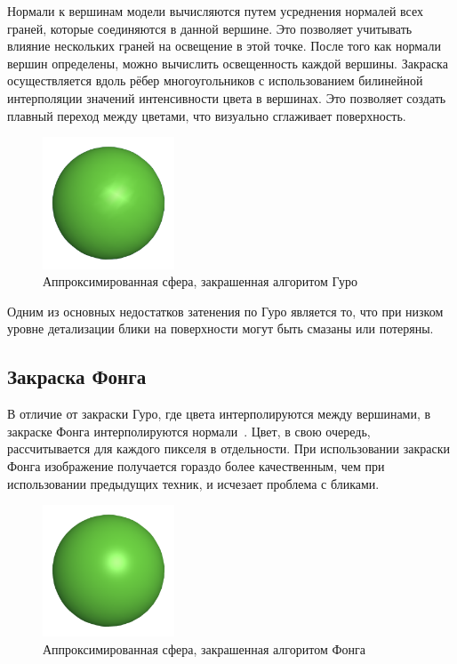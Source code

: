 Нормали к вершинам модели вычисляются путем усреднения нормалей всех граней, которые соединяются в данной вершине. Это позволяет учитывать влияние нескольких граней на освещение в этой точке. После того как нормали вершин определены, можно вычислить освещенность каждой вершины. Закраска осуществляется вдоль рёбер многоугольников с использованием билинейной интерполяции значений интенсивности цвета в вершинах. Это позволяет создать плавный переход между цветами, что визуально сглаживает поверхность.

\begin{figure}[h] 
	\centering
	\includegraphics[width=0.35\textwidth]{images/gurou-shading.png}
	\caption{Аппроксимированная сфера, закрашенная алгоритом Гуро} 
	\label{fig:gurou-shading} 
\end{figure}

Одним из основных недостатков затенения по Гуро является то, что при низком уровне детализации блики на поверхности могут быть смазаны или потеряны.

\subsection{Закраска Фонга}

В отличие от закраски Гуро, где цвета интерполируются между вершинами, в закраске Фонга интерполируются нормали~\cite{lit3}. Цвет, в свою очередь, рассчитывается для каждого пикселя в отдельности. При использовании закраски Фонга изображение получается гораздо более качественным, чем при использовании предыдущих техник, и исчезает проблема с бликами.

\begin{figure}[h] 
	\centering
	\includegraphics[width=0.35\textwidth]{images/phong-shading.png}
	\caption{Аппроксимированная сфера, закрашенная алгоритом Фонга} 
	\label{fig:phong-shading} 
\end{figure}


